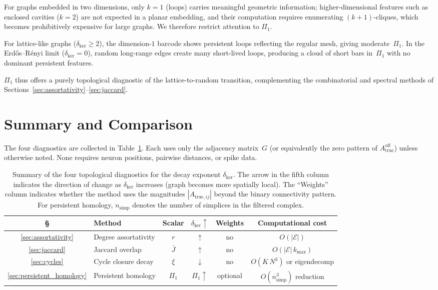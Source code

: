 \documentclass[11pt]{article}
\begin{document}
For graphs embedded in two dimensions, only $k=1$ (loops) carries 
meaningful geometric information; higher-dimensional features such 
as enclosed cavities ($k=2$) are not expected in a planar embedding, 
and their computation requires enumerating $(k{+}1)$-cliques, which 
becomes prohibitively expensive for large graphs.  We therefore 
restrict attention to $\Pi_1$.

For lattice-like graphs ($\delta_{\mathrm{ker}}\geq 2$), the
dimension-$1$ barcode shows persistent loops reflecting the regular 
mesh, giving moderate~$\Pi_1$.  In the Erd\H{o}s--R\'enyi limit
($\delta_{\mathrm{ker}}=0$), random long-range edges create many 
short-lived loops, producing a cloud of short bars in~$\Pi_1$ with 
no dominant persistent features.

$\Pi_1$ thus offers a purely topological diagnostic of the 
lattice-to-random transition, complementing the combinatorial and 
spectral methods of Sections~\ref{sec:assortativity}--\ref{sec:jaccard}.


\section{Summary and Comparison}
\label{sec:summary}

The four diagnostics are collected in
Table~\ref{tab:summary}.  Each uses only the adjacency
matrix~$G$ (or equivalently the zero pattern of
$A_{\mathrm{true}}^{\mathrm{off}}$) unless otherwise noted.  None
requires neuron positions, pairwise distances, or spike data.

\begin{table}[h]
\centering
\renewcommand{\arraystretch}{1.25}
\begin{tabular}{clcccc}
\toprule
\S & Method & Scalar & $\delta_{\mathrm{ker}}\!\uparrow$
  & Weights & Computational cost \\
\midrule
\ref{sec:assortativity}
  & Degree assortativity & $r$ & $\uparrow$
  & no & $O(|\mathcal{E}|)$ \\
\ref{sec:jaccard}
  & Jaccard overlap & $\bar{J}$ & $\uparrow$
  & no & $O(|\mathcal{E}|\,k_{\max})$ \\
\ref{sec:cycles}
  & Cycle closure decay & $\xi$ & $\downarrow$
  & no & $O(K\,N^3)$ or eigendecomp \\
\ref{sec:persistent_homology}
  & Persistent homology & $\Pi_1$ & $\Pi_1\!\uparrow$ & optional & $O(n_{\mathrm{simp}}^3)$ reduction \\
\bottomrule
\end{tabular}
\caption{Summary of the four topological diagnostics for the decay
  exponent $\delta_{\mathrm{ker}}$.
  The arrow in the fifth column indicates the direction of change as
  $\delta_{\mathrm{ker}}$ increases (graph becomes more spatially
  local).  The ``Weights'' column indicates whether the method uses
  the magnitudes $|A_{\mathrm{true},ij}|$ beyond the binary
  connectivity pattern.
  For persistent homology, $n_{\mathrm{simp}}$ denotes the number of
  simplices in the filtered complex.}
\label{tab:summary}
\end{table}
\end{document}
